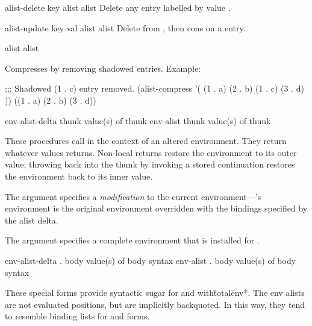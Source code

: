 \begin{defundesc} {alist-delete} {key alist} {alist}
    Delete any entry labelled by value .
\end{defundesc}

\begin{defundesc} {alist-update} {key val alist} {alist}
    Delete  from , then cons on a
     entry.
\end{defundesc}

 {alist} {alist}
\begin{desc}
    Compresses  by removing shadowed entries.
    Example:
\begin{code}
;;; Shadowed (1 . c) entry removed.
(alist-compress '( (1 . a) (2 . b) (1 . c) (3 . d) ))
    {\evalto} ((1 . a) (2 . b) (3 . d))\end{code}
\end{desc}

 {env-alist-delta thunk} {value(s) of thunk}
 {env-alist thunk} {value(s) of thunk}
\begin{desc}
    These procedures call  in the context of an altered
    environment. They return whatever values  returns.
    Non-local returns restore the environment to its outer value;
    throwing back into the thunk by invoking a stored continuation
    restores the environment back to its inner value.

    The  argument specifies
    a \emph{modification} to the current en\-vi\-ron\-ment---'s
    environment is the original environment overridden with the
    bindings specified by the alist delta.

    The  argument specifies a complete environment
    that is installed for .
\end{desc}

 {env-alist-delta . body} {value(s) of body} {syntax}
 {env-alist . body} {value(s) of body} {syntax}
\begin{desc}
    These special forms provide syntactic sugar for 
    and {\ttt with\=total\=env*}. 
    The env alists are not evaluated positions, but are implicitly backquoted.
    In this way, they tend to resemble binding lists for  and
     forms.
\end{desc}


